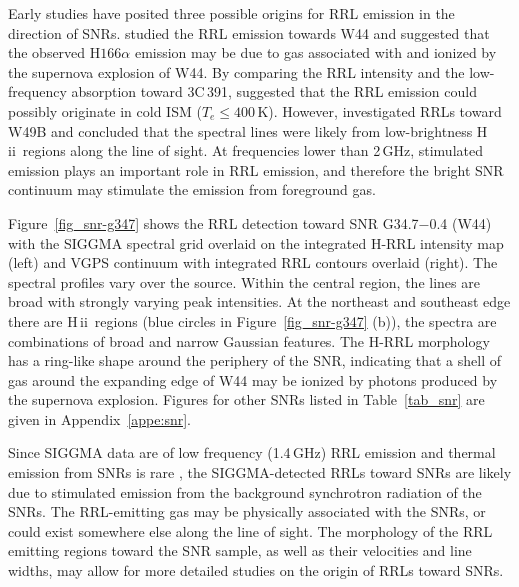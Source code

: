 \documentclass[manuscript]{aastex61}
\newcommand{\hii}{{\rm H\,}{{\sc ii}}}
\newcommand{\ghz}{\,GHz}
\begin{document}
Early studies have posited three possible origins for RRL emission in the direction of SNRs.
\citet{Bignell1973} studied the RRL emission towards W44 and suggested that the observed H$166\alpha$ emission may be due to gas associated with and ionized by the supernova explosion of W44.
By comparing the RRL intensity and the low-frequency absorption toward 3C\,391, \citet{Cesarsky1973b} suggested that the RRL emission could possibly originate in cold ISM ($T_e \leq 400$\,K).
However, \citet{Pankonin1976} investigated RRLs toward W49B and concluded that the spectral lines were likely from low-brightness \hii\ regions along the line of sight.
At frequencies lower than 2\ghz, stimulated emission plays an important role in RRL emission, and therefore the bright SNR continuum may stimulate the emission from foreground gas.

Figure~\ref{fig_snr-g347} shows the RRL detection toward SNR G34.7$-$0.4 (W44) with the SIGGMA spectral grid overlaid on the integrated H-RRL intensity map (left) and VGPS continuum with integrated RRL contours overlaid (right).
The spectral profiles vary over the source.
Within the central region, the lines are broad with strongly varying peak intensities.
At the northeast and southeast edge there are \hii\ regions (blue circles in Figure~\ref{fig_snr-g347} (b)), the spectra are combinations of broad and narrow Gaussian features.
The H-RRL morphology has a ring-like shape around the periphery of the SNR, indicating that a shell of gas around the expanding edge of W44 may be ionized by photons produced by the supernova explosion. 
Figures for other SNRs listed in Table~\ref{tab_snr} are given in Appendix~\ref{appe:snr}.

Since SIGGMA data are of low frequency (1.4\ghz) RRL emission and thermal emission from SNRs is rare \citep{Cruciani2016}, the SIGGMA-detected RRLs toward SNRs are likely due to stimulated emission from the background synchrotron radiation of the SNRs.
The RRL-emitting gas may be physically associated with the SNRs, or could exist somewhere else along the line of sight.
The morphology of the RRL emitting regions toward the SNR sample, as well as their velocities and line widths, may allow for more detailed studies on the origin of RRLs toward SNRs.
\end{document}
